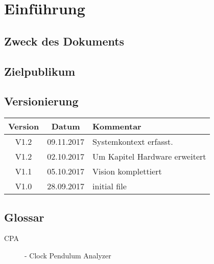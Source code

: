 \section{Einführung}
		\subsection{Zweck des Dokuments}
		\subsection{Zielpublikum}
		\subsection{Versionierung}
			\begin{table}[h]
				\centering
				\begin{tabularx}{\textwidth}{|c|c|X|}
				\hline
				\rowcolor{shadecolor}\textbf{Version} & \textbf{Datum} & \textbf{Kommentar}\\ \hline
                V1.2 & 09.11.2017 & Systemkontext erfasst.\\ \hline
                V1.2 & 02.10.2017 & Um Kapitel Hardware erweitert \\ \hline
        		V1.1 & 05.10.2017 & Vision komplettiert \\ \hline
				V1.0 & 28.09.2017 & initial file \\ \hline
				\end{tabularx}
			\end{table}
		\subsection{Glossar}
			\begin{description}
				\item[CPA]- Clock Pendulum Analyzer
			\end{description}